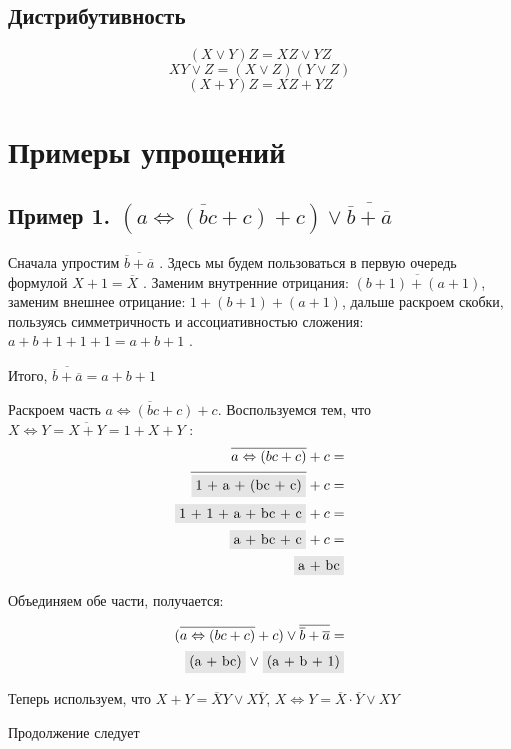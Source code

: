\documentclass{article}
\numberwithin{equation}{subsection}
\renewcommand{\[}{\begin{equation}}
\renewcommand{\]}{\end{equation}}
\newcommand{\bx}[1]{\fcolorbox{white}{gray!20}{#1}}
\begin{document}
\subsection{Дистрибутивность}
\[(X\vee Y)Z = XZ \vee YZ\]
\[XY \vee Z = (X \vee Z)(Y \vee Z)\]
\[(X+ Y)Z = XZ + YZ\]

\section{Примеры упрощений}
\subsection{Пример 1.
$(\overline {a\Leftrightarrow (bc+ c)} + c)\vee \overline {\overline b+\overline a}$
}

Сначала упростим $\overline {\overline b+\overline a}$ . Здесь мы будем пользоваться в первую очередь формулой $ X + 1 = \overline X$ . Заменим внутренние отрицания: $\overline {(b + 1) +(a + 1)}$, заменим внешнее отрицание: $ 1 + (b + 1) + (a + 1)$, дальше раскроем скобки, пользуясь симметричность и ассоциативностью сложения: $ a + b + 1 + 1 + 1 = a + b + 1 $ .

Итого, $\overline {\overline b+\overline a} = a + b + 1 $

Раскроем часть $\overline {a\Leftrightarrow (bc+ c)} + c $. Воспользуемся тем, что $ X\Leftrightarrow Y=\overline{X + Y} = 1 + X + Y $ :
\begin{align}
\overline {a\Leftrightarrow (bc+ c)} + c = \\
\overline {\bx{1 + a + (bc + c)}} + c = \\
\bx{1 + 1 + a + bc + c} + c = \\
\bx{a + bc + c} + c = \\
\bx{a + bc}
\end{align}

Объединяем обе части, получается:

\begin{align}
(\overline {a\Leftrightarrow (bc+ c)} + c)\vee \overline {\overline b+\overline a} = \\
\bx{(a + bc)} \vee \bx{(a + b + 1)}
\end{align}

Теперь используем, что $X + Y = \overline{X}Y \vee X\overline{Y}$,
$X \Leftrightarrow Y = \overline{X}\cdot\overline{Y} \vee XY$

Продолжение следует
\end{document}
